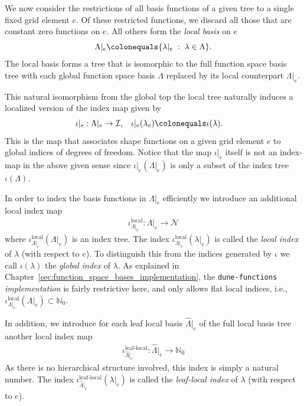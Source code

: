 \documentclass[a4paper,10pt,headings=normal,bibliography=totoc]{scrartcl}
\newcommand{\dunemodule}[1]{\texttt{#1}}
\begin{document}
We now consider the restrictions of all basis functions of a given tree to a single fixed grid element $e$.
Of these restricted functions, we discard all those that are constant zero functions on $e$.
All others form the \emph{local basis} on $e$
\begin{equation*}
 \Lambda|_e
 \colonequals
 \{ \lambda|_e \; : \; \lambda \in \Lambda \}.
\end{equation*}
The local basis forms a tree that is isomorphic to the full function space basis tree
with each global function space basis $\Lambda$ replaced by its local counterpart $\Lambda|_e$.

This natural isomorphism from the global top the local tree
naturally induces a localized version of the index map given by
\begin{align*}
  \iota|_e : \Lambda|_e &\to \mathcal{I}, &
  \iota|_e(\lambda_e) &\colonequals \iota(\lambda).
\end{align*}
This is the map that associates shape functions on a given grid element $e$ to global indices of
degrees of freedom.
Notice that the map $\iota|_e$ itself is not an index-map in the above given sense
since $\iota|_e(\Lambda|_e)$ is only a subset of the index tree $\iota(\Lambda)$.

In order to index the basis functions in $\Lambda|_e$ efficiently we introduce
an additional local index map
\begin{align*}
  \iota^{\text{local}}_{\Lambda|_e}: \Lambda|_e \to \mathcal{N}
\end{align*}
where $\iota^{\text{local}}_{\Lambda|_e}(\Lambda|_e)$ is an index tree.
The index $\iota^{\text{local}}_{\Lambda|_e}(\lambda|_e)$ is
called the \emph{local index} of $\lambda$ (with respect to $e$).
To distinguish this from the indices generated by $\iota$
we call $\iota(\lambda)$ the \emph{global index} of $\lambda$.
As explained in Chapter~\ref{sec:function_space_bases_implementation},
the \dunemodule{dune-functions} \emph{implementation} is fairly restrictive here,
and only allows flat local indices, i.e.,
$\iota^{\text{local}}_{\Lambda|_e}(\Lambda|_e) \subset \mathbb{N}_0.$

In addition, we introduce for each leaf local basis $\hat{\Lambda}|_e$
of the full local basis tree another local index map
\begin{align*}
  \iota^{\text{leaf-local}}_{\hat{\Lambda}|_e}: \hat{\Lambda}|_e \to \mathbb{N}_0
\end{align*}
As there is no hierarchical structure involved, this index is simply a
natural number.
The index $\iota^{\text{leaf-local}}_{\hat{\Lambda}|_e}(\lambda|_e)$ is
called the \emph{leaf-local index} of $\lambda$ (with respect to $e$).
\end{document}
